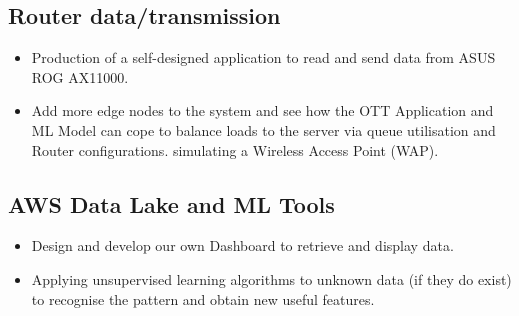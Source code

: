 \subsection{Router data/transmission}

\begin{itemize}
  \item Production of a self-designed application to read and send data from ASUS ROG AX11000.
  \item Add more edge nodes to the system and see how the OTT Application and ML Model can cope to
balance loads to the server via queue utilisation and Router configurations. simulating a Wireless Access Point (WAP).
\end{itemize}

\subsection{AWS Data Lake and ML Tools}

\begin{itemize}
  \item Design and develop our own Dashboard to retrieve and display data.
  \item Applying unsupervised learning algorithms to unknown data (if they do exist) to recognise the pattern and obtain new useful features.
\end{itemize}
\fi